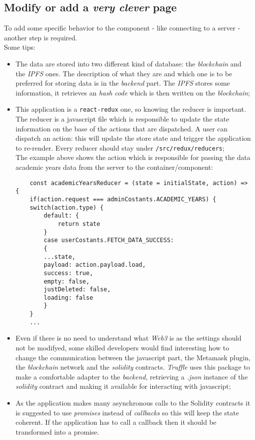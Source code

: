 \subsection{Modify or add a \emph{very clever} page}
\label{IPFS}
To add some specific behavior to the component - like connecting to a server - another step is required.
\\Some tips:
\begin{itemize}
	\item The data are stored into two different kind of database: the \emph{blockchain} and the \emph{IPFS} ones. The description of what they are and which one is to be preferred for storing data is in the \emph{backend} part. The \emph{IPFS} stores some information, it retrieves an \emph{hash code} which is then written on the \emph{blockchain};
	\item This application is a \verb|react-redux| one, so knowing the reducer is important. The reducer is a javascript file which is responsible to update the state information on the base of the actions that are dispatched. A user can dispatch an action: this will update the store state and trigger the application to re-render. Every reducer should stay under \verb|/src/redux/reducers|;
	\\The example above shows the action which is responsible for passing the data academic years data from the server to the container/component:
	\begin{lstlisting}
	const academicYearsReducer = (state = initialState, action) => {
	if(action.request === adminCostants.ACADEMIC_YEARS) {
	switch(action.type) {
		default: {
			return state
		}
		case userCostants.FETCH_DATA_SUCCESS:
		{
		...state,
		payload: action.payload.load,
		success: true,
		empty: false,
		justDeleted: false,
		loading: false
		}
	}
	...
	\end{lstlisting}
	\item Even if there is no need to understand what \emph{Web3} is as the settings should not be modifyed, some skilled developers would find interesting how to change the communication between the javascript part, the Metamask plugin, the \emph{blockchain} network and the \emph{solidity} contracts. \emph{Truffle} uses this package to make a comfortable adapter to the \emph{backend}, retrieving a \emph{.json} instance of the \emph{solidity} contract and making it available for interacting with javascript;
	\item As the application makes many asynchronous calls to the Solidity contracts it is suggested to use \emph{promises} instead of \emph{callbacks} so this will keep the state coherent. If the application has to call a callback then it should be transformed into a promise.
\end{itemize}

